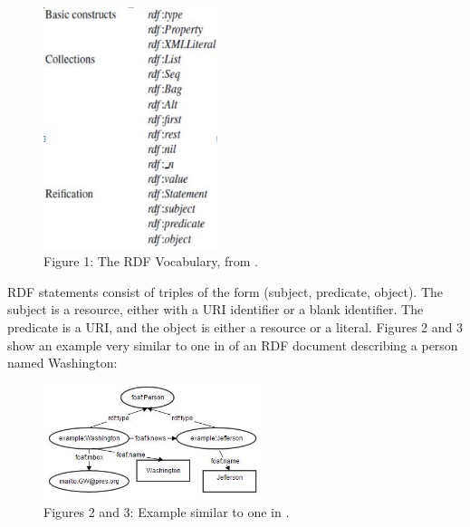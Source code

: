 \documentclass[10pt,journal,compsoc]{IEEEtran}
\begin{document}
\begin{figure}[htbp] %
   \centering
   \includegraphics[width=2in]{RDFVocabPic.jpg} 
\caption*{Figure 1: The RDF Vocabulary, from \cite{_social_2007}.}
   \label{}
\label{}   
\end{figure}


RDF statements consist of triples of the form (subject, predicate, object).  The subject is a resource, either with a URI identifier or a blank identifier.  The predicate is a URI, and the object is either a resource or a literal. Figures 2 and 3 show an example very similar to one in \cite{_social_2007} of an RDF document describing a person named Washington: 

\begin{figure}[h] %
   \centering
   \includegraphics[width=2.5in]{WashJeffPic.jpg} 
\caption*{Figures 2 and 3: Example similar to one in \cite{_social_2007}.}
   \label{}
\label{}   
\end{figure}
\end{document}
